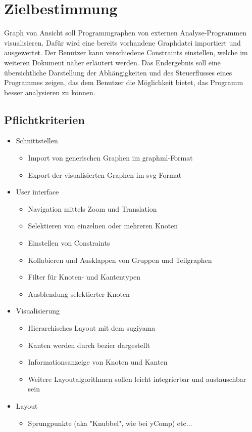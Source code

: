 \chapter{Zielbestimmung}

Graph von Ansicht soll Programmgraphen von externen Analyse-Programmen visualisieren. Dafür wird eine bereits vorhandene Graphdatei importiert und ausgewertet. Der Benutzer kann verschiedene Constraints einstellen, welche im weiteren Dokument näher erläutert werden. 
Das Endergebnis soll eine übersichtliche Darstellung der Abhängigkeiten und des Steuerflusses eines Programmes zeigen, das dem Benutzer die Möglichkeit bietet, das Programm besser analysieren zu können.

\section{Pflichtkriterien}

\begin{itemize}
\item Schnittstellen
\begin{itemize}
\item Import von generischen Graphen im \gls{graphml}-Format
\item Export der visualisierten Graphen im \gls{svg}-Format
\end{itemize}
\item User interface
\begin{itemize}
\item Navigation mittels Zoom und Translation
\item Selektieren von einzelnen oder mehreren Knoten
\item Einstellen von Constraints
\item Kollabieren und Ausklappen von Gruppen und Teilgraphen
\item Filter für Knoten- und Kantentypen
\item Ausblendung selektierter Knoten
\end{itemize}
\item Visualisierung
\begin{itemize}
\item Hierarchisches Layout mit dem \gls{sugiyama}
\item Kanten werden durch \gls{bezier} dargestellt
\item Informationsanzeige von Knoten und Kanten
\item Weitere Layoutalgorithmen sollen leicht integrierbar und austauschbar sein
\end{itemize}
\item Layout
\begin{itemize}
	\item Sprungpunkte (aka "Knubbel", wie bei yComp) etc...
\end{itemize}
\end{itemize}

